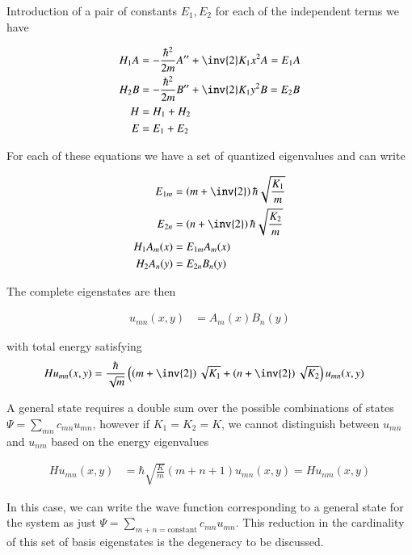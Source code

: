 Introduction of a pair of constants $E_1, E_2$ for each of the independent terms we have

\begin{align}\label{eqn:desaiCh9:403}
H_1 A &= -\frac{\hbar^2}{2m} A'' + \inv{2} K_1 x^2 A = E_1 A \\
H_2 B &= -\frac{\hbar^2}{2m} B'' + \inv{2} K_1 y^2 B = E_2 B \\
H &= H_1 + H_2 \\
E  &= E_1 + E_2
\end{align}

For each of these equations we have a set of quantized eigenvalues and can write

\begin{align}\label{eqn:desaiCh9:404}
E_{1m} &= \left(m + \inv{2}\right) \hbar \sqrt{\frac{K_1}{m}} \\
E_{2n} &= \left(n + \inv{2}\right) \hbar \sqrt{\frac{K_2}{m}} \\
H_1 A_m(x) &= E_{1m} A_m(x) \\
H_2 A_n(y) &= E_{2n} B_n(y)
\end{align}

The complete eigenstates are then

\begin{align}\label{eqn:desaiCh9:405}
u_{mn}(x,y) &= A_m(x) B_n(y)
\end{align}

with total energy satisfying
\begin{align}\label{eqn:desaiCh9:406}
H u_{mn}(x,y) &=
\frac{\hbar}{\sqrt{m}} \left( \left(m + \inv{2}\right) \sqrt{K_1} + \left(n + \inv{2}\right) \sqrt{K_2} \right) u_{mn}(x,y)
\end{align}

A general state requires a double sum over the possible combinations of states $\Psi = \sum_{mn} c_{mn} u_{mn}$, however if $K_1 = K_2 = K$, we cannot distinguish between $u_{mn}$ and $u_{nm}$ based on the energy eigenvalues

\begin{align}\label{eqn:desaiCh9:407}
H u_{mn}(x,y) &= \hbar\sqrt{\frac{K}{m}} \left( m + n + 1 \right) u_{mn}(x,y) = H u_{nm}(x,y)
\end{align}

In this case, we can write the wave function corresponding to a general state for the system as just $\Psi = \sum_{m+ n = \text{constant}} c_{mn} u_{mn}$.  This reduction in the cardinality of this set of basis eigenstates is the degeneracy to be discussed.


